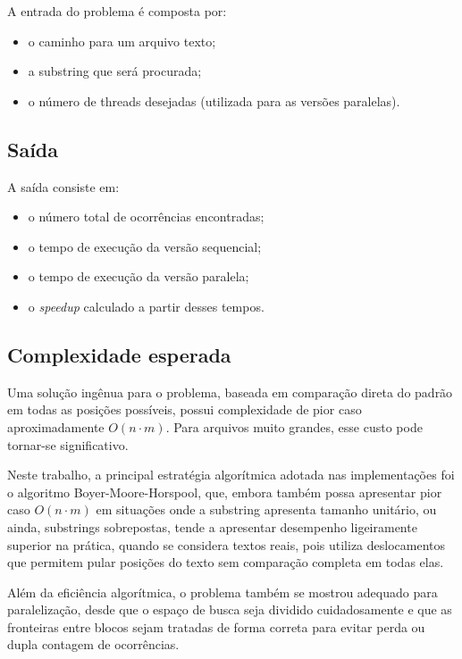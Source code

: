 \documentclass[10pt,twocolumn,a4paper]{article}
\begin{document}
A entrada do problema é composta por:

\begin{itemize}[leftmargin=*]
    \item o caminho para um arquivo texto;
    \item a substring que será procurada;
    \item o número de threads desejadas (utilizada para as versões paralelas).
\end{itemize}

\subsection{Saída}

A saída consiste em:

\begin{itemize}[leftmargin=*]
    \item o número total de ocorrências encontradas;
    \item o tempo de execução da versão sequencial;
    \item o tempo de execução da versão paralela;
    \item o \textit{speedup} calculado a partir desses tempos.
\end{itemize}

\subsection{Complexidade esperada}

Uma solução ingênua para o problema, baseada em comparação direta do padrão em todas as posições possíveis, possui complexidade de pior caso aproximadamente $O(n \cdot m)$. Para arquivos muito grandes, esse custo pode tornar-se significativo.

Neste trabalho, a principal estratégia algorítmica adotada nas implementações foi o algoritmo Boyer-Moore-Horspool, que, embora também possa apresentar pior caso $O(n \cdot m)$ em situações onde a substring apresenta tamanho unitário, ou ainda, substrings sobrepostas, tende a apresentar desempenho ligeiramente superior na prática, quando se considera textos reais, pois utiliza deslocamentos que permitem pular posições do texto sem comparação completa em todas elas.

Além da eficiência algorítmica, o problema também se mostrou adequado para paralelização, desde que o espaço de busca seja dividido cuidadosamente e que as fronteiras entre blocos sejam tratadas de forma correta para evitar perda ou dupla contagem de ocorrências.
\end{document}
